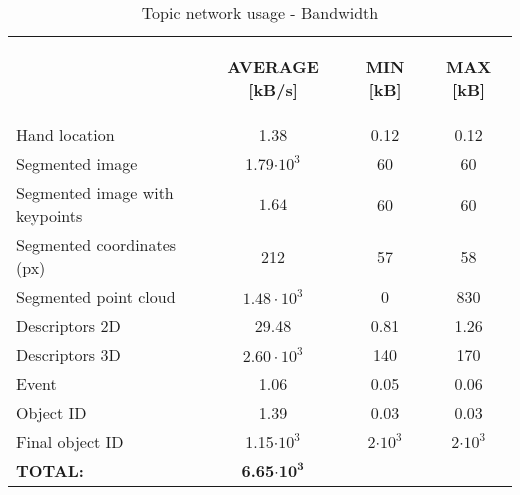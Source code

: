 





\begin{table}[H]
\centering
\begin{tabular} {l  c c c  }
\toprule
\addlinespace[3mm]
   \multicolumn{1}{c}{\begin{center}\textbf{TOPIC}\end{center}} &
   \multicolumn{1}{c}{\begin{flushright}\textbf{AVERAGE [kB/s]}\end{flushright}} &
   \multicolumn{1}{c}{\begin{flushright}\textbf{MIN [kB]}\end{flushright}} &
   \multicolumn{1}{c}{\begin{flushright}\textbf{MAX [kB]}\end{flushright}} &\\

\addlinespace[-3mm]
\midrule

Hand location & 1.38 &  0.12 	& 0.12  \\
Segmented image & 1.79$\cdot10^{3}$		&	60	&	60
\\
Segmented image with keypoints & $1.64$	&	60	&	60
\\
Segmented coordinates (px) & 212& 57 & 58 \\
Segmented point cloud & $1.48\cdot10^{3}$ & 	0	&	830
\\
Descriptors 2D & 29.48	&	0.81 &	1.26 
\\
Descriptors 3D & $2.60\cdot10^{3}$	&	140	&	170
\\
Event & 1.06&	0.05 &	0.06 
\\
Object ID & 1.39	&		0.03 & 		0.03 
\\
Final object ID & 1.15$\cdot10^{3}$	&		2$\cdot10^{3}$	&	2$\cdot10^{3}$	
\\
\midrule

\textbf{TOTAL: } & \textbf{6.65}$\mathbf{\cdot 10^{3}}$ && \\
\bottomrule

\end{tabular}
\caption[Topic network usage - Bandwidth]{Topic network usage - Bandwidth}
\label{bw}

\end{table}


